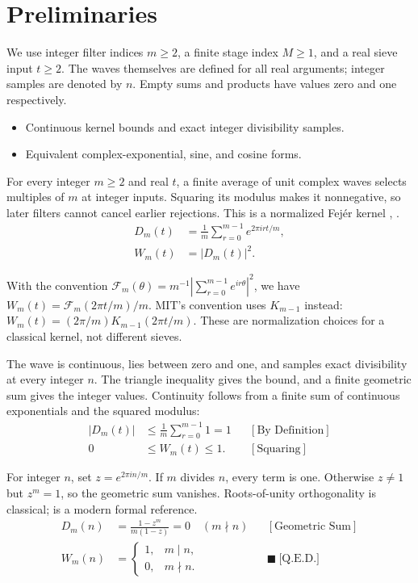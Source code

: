 \section{Preliminaries}
We use integer filter indices $m\ge2$, a finite stage index $M\ge1$,
and a real sieve input $t\ge2$. The waves themselves are defined for all
real arguments; integer samples are denoted by $n$. Empty sums and products
have values zero and one respectively.

\begin{itemize}
\item Continuous kernel bounds and exact integer divisibility samples.
\item Equivalent complex-exponential, sine, and cosine forms.
\end{itemize}

For every integer $m\ge2$ and real $t$, a finite average of unit complex
waves selects multiples of $m$ at integer inputs. Squaring its modulus makes
it nonnegative, so later filters cannot cancel earlier rejections. This is a
normalized Fejér kernel \cite{fejer1900}, \cite{mit2021}.
\begin{equation*}
\begin{aligned}
D_m(t)&=\frac1m\sum_{r=0}^{m-1}e^{2\pi i r t/m},\\
W_m(t)&=|D_m(t)|^2.
\end{aligned}
\end{equation*}

With the convention $\mathcal F_m(\theta)=m^{-1}|\sum_{r=0}^{m-1}e^{ir\theta}|^2$,
we have $W_m(t)=\mathcal F_m(2\pi t/m)/m$. MIT's convention \cite{mit2021}
uses $K_{m-1}$ instead: $W_m(t)=(2\pi/m)K_{m-1}(2\pi t/m)$.
These are normalization choices for a classical kernel, not different sieves.

The wave is continuous, lies between zero and one, and samples
exact divisibility at every integer $n$. The triangle inequality gives the
bound, and a finite geometric sum gives the integer values. Continuity follows
from a finite sum of continuous exponentials and the squared modulus:
\begin{equation*}
\begin{aligned}
|D_m(t)|&\le\frac1m\sum_{r=0}^{m-1}1=1
&&[\text{By Definition}]\\
0&\le W_m(t)\le1.
&&[\text{Squaring}]
\end{aligned}
\end{equation*}

For integer $n$, set $z=e^{2\pi i n/m}$. If $m$ divides $n$, every term is one.
Otherwise $z\ne1$ but $z^m=1$, so the geometric sum vanishes. Roots-of-unity
orthogonality is classical; \cite{rayaeberl2019} is a modern formal reference.
\begin{equation*}
\begin{aligned}
D_m(n)&=\frac{1-z^m}{m(1-z)}=0\quad(m\nmid n)
&&[\text{Geometric Sum}]\\
W_m(n)&=\begin{cases}1,&m\mid n,\\0,&m\nmid n.\end{cases}
&&\blacksquare\ \text{[Q.E.D.]}
\end{aligned}
\end{equation*}

